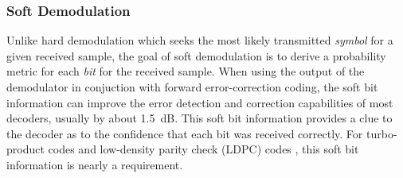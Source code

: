 \subsubsection{Soft Demodulation}
\label{module:modem:digital:soft}
Unlike hard demodulation which seeks the most likely transmitted
{\em symbol} for a given received sample,
the goal of soft demodulation is to derive a probability metric for each
{\em bit} for the received sample.
When using the output of the demodulator in conjuction with forward
error-correction coding, the soft bit information can improve the error
detection and correction capabilities of most decoders,
usually by about 1.5~dB.
This soft bit information provides a clue to the decoder as to the
confidence that each bit was received correctly.
For turbo-product codes \cite{Berrou:1993} and
low-density parity check (LDPC) codes \cite{Gallager:1962},
this soft bit information is nearly a requirement.

